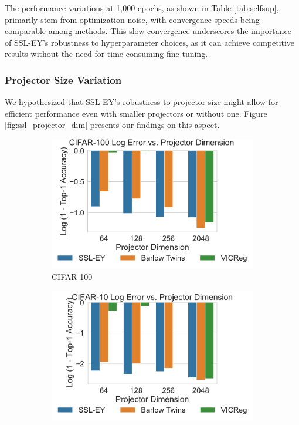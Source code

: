 The performance variations at 1,000 epochs, as shown in Table \ref{tab:selfsup}, primarily stem from optimization noise, with convergence speeds being comparable among methods. This slow convergence underscores the importance of SSL-EY's robustness to hyperparameter choices, as it can achieve competitive results without the need for time-consuming fine-tuning.

\subsubsection{Projector Size Variation}
We hypothesized that SSL-EY's robustness to projector size might allow for efficient performance even with smaller projectors or without one. Figure \ref{fig:ssl_projector_dim} presents our findings on this aspect.

\begin{figure}[H]
    \begin{subfigure}[b]{0.48\textwidth}
        \centering
        \includegraphics[width=\textwidth]{figures/SSL/cifar100_proj_dim_log_error}
        \caption{CIFAR-100}
        \label{fig:ssl_projector_dimensions_100}
    \end{subfigure}
    \hfill
    \begin{subfigure}[b]{0.48\textwidth}
        \centering
        \includegraphics[width=\textwidth]{figures/SSL/cifar10_proj_dim_log_error}

\end{subfigure}
\end{figure}
